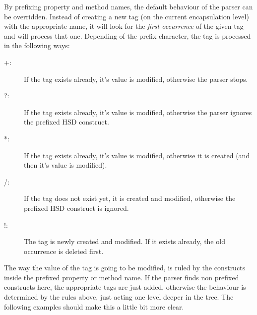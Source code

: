 By prefixing property and method names, the default behaviour of the parser can
be overridden. Instead of creating a new tag (on the current encapsulation level)
with the appropriate name, it will look for the \emph{first occurrence} of the
given tag and will process that one. Depending of the prefix character, the tag
is processed in the following ways:
\begin{description}
\item[+:] If the tag exists already, it's value is modified, otherwise the
  parser stops.
\item[?:] If the tag exists already, it's value is modified, otherwise the
  parser ignores the prefixed HSD construct.
\item[*:] If the tag exists already, it's value is modified, otherwise it is
  created (and then it's value is modified).
\item[/:] If the tag does not exist yet, it is created and modified, otherwise
  the prefixed HSD construct is ignored.
\item[!:] The tag is newly created and modified. If it exists already, the old
  occurrence is deleted first.
\end{description}

The way the value of the tag is going to be modified, is ruled by the constructs
inside the prefixed property or method name. If the parser finds non prefixed
constructs here, the appropriate tags are just added, otherwise the behaviour is
determined by the rules above, just acting one level deeper in the tree. The
following examples should make this a little bit more clear.

